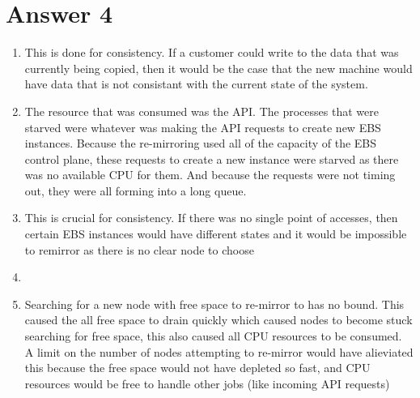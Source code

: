 \documentclass[11pt]{article}
\theoremstyle{definition}
\begin{document}
\section*{Answer 4}
\begin{enumerate}
  \item This is done for consistency.  If a customer could write to the data that was currently being copied, then it would be the case that the new machine would have data that is not consistant with the current state of the system.

  \item The resource that was consumed was the API.  The processes that were starved were whatever was making the API requests to create new EBS instances.  Because the re-mirroring used all of the capacity of the EBS control plane, these requests to create a new instance were starved as there was no available CPU for them.  And because the requests were not timing out, they were all forming into a long queue.

  \item This is crucial for consistency.  If there was no single point of accesses, then certain EBS instances would have different states and it would be impossible to remirror as there is no clear node to choose

  \item

  \item Searching for a new node with free space to re-mirror to has no bound.  This caused the all free space to drain quickly which caused nodes to become stuck searching for free space, this also caused all CPU resources to be consumed.  A limit on the number of nodes attempting to re-mirror would have alieviated this because the free space would not have depleted so fast, and CPU resources would be free to handle other jobs (like incoming API requests)
\end{enumerate}
\end{document}
